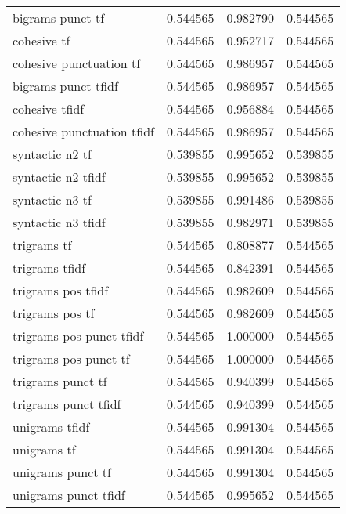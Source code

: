 \begin{tabular}{lrrr}
bigrams punct tf           &  0.544565 &       0.982790 &             0.544565 \\
cohesive tf                &  0.544565 &       0.952717 &             0.544565 \\
cohesive punctuation tf    &  0.544565 &       0.986957 &             0.544565 \\
bigrams punct tfidf        &  0.544565 &       0.986957 &             0.544565 \\
cohesive tfidf             &  0.544565 &       0.956884 &             0.544565 \\
cohesive punctuation tfidf &  0.544565 &       0.986957 &             0.544565 \\
syntactic n2 tf            &  0.539855 &       0.995652 &             0.539855 \\
syntactic n2 tfidf         &  0.539855 &       0.995652 &             0.539855 \\
syntactic n3 tf            &  0.539855 &       0.991486 &             0.539855 \\
syntactic n3 tfidf         &  0.539855 &       0.982971 &             0.539855 \\
trigrams tf                &  0.544565 &       0.808877 &             0.544565 \\
trigrams tfidf             &  0.544565 &       0.842391 &             0.544565 \\
trigrams pos tfidf         &  0.544565 &       0.982609 &             0.544565 \\
trigrams pos tf            &  0.544565 &       0.982609 &             0.544565 \\
trigrams pos punct tfidf   &  0.544565 &       1.000000 &             0.544565 \\
trigrams pos punct tf      &  0.544565 &       1.000000 &             0.544565 \\
trigrams punct tf          &  0.544565 &       0.940399 &             0.544565 \\
trigrams punct tfidf       &  0.544565 &       0.940399 &             0.544565 \\
unigrams tfidf             &  0.544565 &       0.991304 &             0.544565 \\
unigrams tf                &  0.544565 &       0.991304 &             0.544565 \\
unigrams punct tf          &  0.544565 &       0.991304 &             0.544565 \\
unigrams punct tfidf       &  0.544565 &       0.995652 &             0.544565 \\
\bottomrule
\end{tabular}
